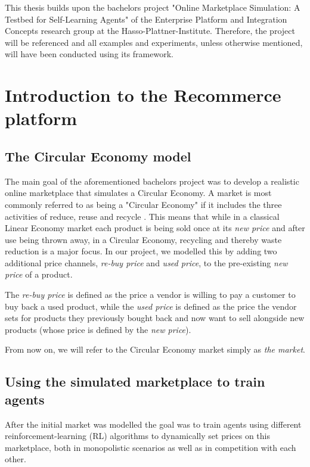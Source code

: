 \begin{jointwork}
	This thesis builds upon the bachelors project "Online Marketplace Simulation: A Testbed for Self-Learning Agents"
	of the Enterprise Platform and Integration Concepts research group at the Hasso-Plattner-Institute. Therefore, the project will
	be referenced and all examples and experiments, unless otherwise mentioned, will have been conducted using its framework. 
\end{jointwork}

\section{Introduction to the Recommerce platform}

\subsection{The Circular Economy model}
The main goal of the aforementioned bachelors project was to develop a realistic online marketplace that simulates 
a Circular Economy. A market is most commonly referred to as being a "Circular Economy" if it includes the three
activities of reduce, reuse and recycle \cite{circularEconomyDefinition}. This means that while in a classical 
Linear Economy market each product is being sold once at its \emph{new price} and after use being thrown away,
in a Circular Economy, recycling and thereby waste reduction is a major focus. In our project, we modelled this by
adding two additional price channels, \emph{re-buy price} and \emph{used price}, to the pre-existing \emph{new price} of a product.

The \emph{re-buy price} is defined as the price a vendor is willing to pay a customer to buy back a used product, while the
\emph{used price} is defined as the price the vendor sets for products they previously bought back and now want to sell alongside new products
(whose price is defined by the \emph{new price}).

From now on, we will refer to the Circular Economy market simply as \emph{the market}.

\subsection{Using the simulated marketplace to train agents}

After the initial market was modelled the goal was to train agents using different reinforcement-learning (RL) algorithms 
to dynamically set prices on this marketplace, both in monopolistic scenarios as well as in competition with each other.


